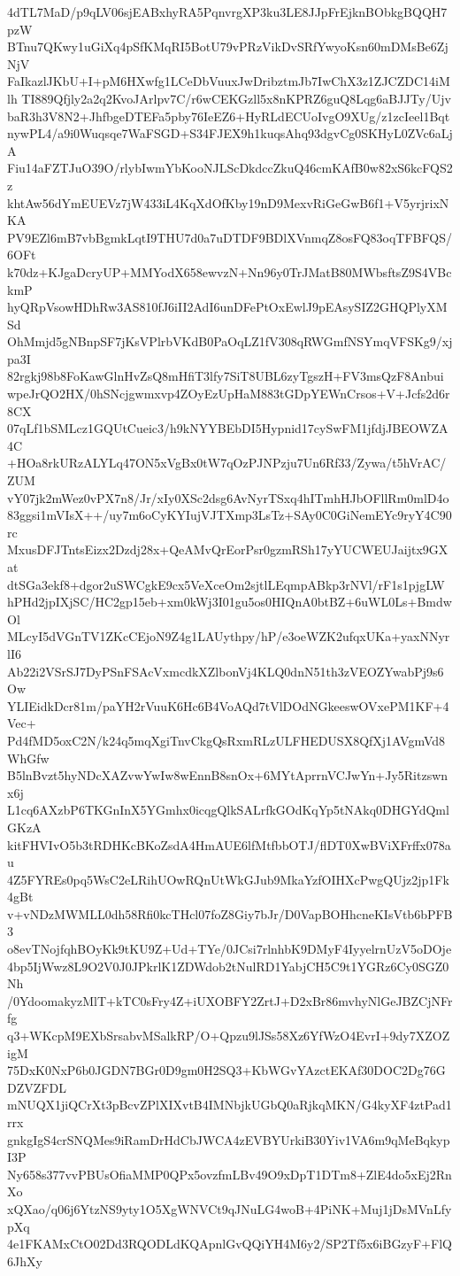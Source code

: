 4dTL7MaD/p9qLV06sjEABxhyRA5PqnvrgXP3ku3LE8JJpFrEjknBObkgBQQH7pzW
BTnu7QKwy1uGiXq4pSfKMqRI5BotU79vPRzVikDvSRfYwyoKsn60mDMsBe6ZjNjV
FaIkazlJKbU+I+pM6HXwfg1LCeDbVuuxJwDribztmJb7IwChX3z1ZJCZDC14iMlh
TI889Qfjly2a2q2KvoJArlpv7C/r6wCEKGzll5x8nKPRZ6guQ8Lqg6aBJJTy/Ujv
baR3h3V8N2+JhfbgeDTEFa5pby76IeEZ6+HyRLdECUoIvgO9XUg/z1zcIeel1Bqt
nywPL4/a9i0Wuqsqe7WaFSGD+S34FJEX9h1kuqsAhq93dgvCg0SKHyL0ZVc6aLjA
Fiu14aFZTJuO39O/rlybIwmYbKooNJLScDkdccZkuQ46cmKAfB0w82xS6kcFQS2z
khtAw56dYmEUEVz7jW433iL4KqXdOfKby19nD9MexvRiGeGwB6f1+V5yrjrixNKA
PV9EZl6mB7vbBgmkLqtI9THU7d0a7uDTDF9BDlXVnmqZ8osFQ83oqTFBFQS/6OFt
k70dz+KJgaDcryUP+MMYodX658ewvzN+Nn96y0TrJMatB80MWbsftsZ9S4VBckmP
hyQRpVsowHDhRw3AS810fJ6iII2AdI6unDFePtOxEwlJ9pEAsySIZ2GHQPlyXMSd
OhMmjd5gNBnpSF7jKsVPlrbVKdB0PaOqLZ1fV308qRWGmfNSYmqVFSKg9/xjpa3I
82rgkj98b8FoKawGlnHvZsQ8mHfiT3lfy7SiT8UBL6zyTgszH+FV3msQzF8Anbui
wpeJrQO2HX/0hSNcjgwmxvp4ZOyEzUpHaM883tGDpYEWnCrsos+V+Jcfs2d6r8CX
07qLf1bSMLcz1GQUtCueic3/h9kNYYBEbDI5Hypnid17cySwFM1jfdjJBEOWZA4C
+HOa8rkURzALYLq47ON5xVgBx0tW7qOzPJNPzju7Un6Rf33/Zywa/t5hVrAC/ZUM
vY07jk2mWez0vPX7n8/Jr/xIy0XSc2dsg6AvNyrTSxq4hITmhHJbOFllRm0mlD4o
83ggsi1mVIsX++/uy7m6oCyKYIujVJTXmp3LsTz+SAy0C0GiNemEYc9ryY4C90rc
MxusDFJTntsEizx2Dzdj28x+QeAMvQrEorPsr0gzmRSh17yYUCWEUJaijtx9GXat
dtSGa3ekf8+dgor2uSWCgkE9cx5VeXceOm2sjtlLEqmpABkp3rNVl/rF1s1pjgLW
hPHd2jpIXjSC/HC2gp15eb+xm0kWj3I01gu5os0HIQnA0btBZ+6uWL0Ls+BmdwOl
MLcyI5dVGnTV1ZKcCEjoN9Z4g1LAUythpy/hP/e3oeWZK2ufqxUKa+yaxNNyrlI6
Ab22i2VSrSJ7DyPSnFSAcVxmcdkXZlbonVj4KLQ0dnN51th3zVEOZYwabPj9s6Ow
YLIEidkDcr81m/paYH2rVuuK6Hc6B4VoAQd7tVlDOdNGkeeswOVxePM1KF+4Vec+
Pd4fMD5oxC2N/k24q5mqXgiTnvCkgQsRxmRLzULFHEDUSX8QfXj1AVgmVd8WhGfw
B5lnBvzt5hyNDcXAZvwYwIw8wEnnB8snOx+6MYtAprrnVCJwYn+Jy5Ritzswnx6j
L1cq6AXzbP6TKGnInX5YGmhx0icqgQlkSALrfkGOdKqYp5tNAkq0DHGYdQmlGKzA
kitFHVIvO5b3tRDHKcBKoZsdA4HmAUE6lfMtfbbOTJ/flDT0XwBViXFrffx078au
4Z5FYREs0pq5WsC2eLRihUOwRQnUtWkGJub9MkaYzfOIHXcPwgQUjz2jp1Fk4gBt
v+vNDzMWMLL0dh58Rfi0kcTHcl07foZ8Giy7bJr/D0VapBOHhcneKIsVtb6bPFB3
o8evTNojfqhBOyKk9tKU9Z+Ud+TYe/0JCsi7rlnhbK9DMyF4IyyelrnUzV5oDOje
4bp5IjWwz8L9O2V0J0JPkrlK1ZDWdob2tNulRD1YabjCH5C9t1YGRz6Cy0SGZ0Nh
/0YdoomakyzMlT+kTC0sFry4Z+iUXOBFY2ZrtJ+D2xBr86mvhyNlGeJBZCjNFrfg
q3+WKcpM9EXbSrsabvMSalkRP/O+Qpzu9lJSs58Xz6YfWzO4EvrI+9dy7XZOZigM
75DxK0NxP6b0JGDN7BGr0D9gm0H2SQ3+KbWGvYAzctEKAf30DOC2Dg76GDZVZFDL
mNUQX1jiQCrXt3pBcvZPlXIXvtB4IMNbjkUGbQ0aRjkqMKN/G4kyXF4ztPad1rrx
gnkgIgS4crSNQMes9iRamDrHdCbJWCA4zEVBYUrkiB30Yiv1VA6m9qMeBqkypI3P
Ny658s377vvPBUsOfiaMMP0QPx5ovzfmLBv49O9xDpT1DTm8+ZlE4do5xEj2RnXo
xQXao/q06j6YtzNS9yty1O5XgWNVCt9qJNuLG4woB+4PiNK+Muj1jDsMVnLfypXq
4e1FKAMxCtO02Dd3RQODLdKQApnlGvQQiYH4M6y2/SP2Tf5x6iBGzyF+FlQ6JhXy
